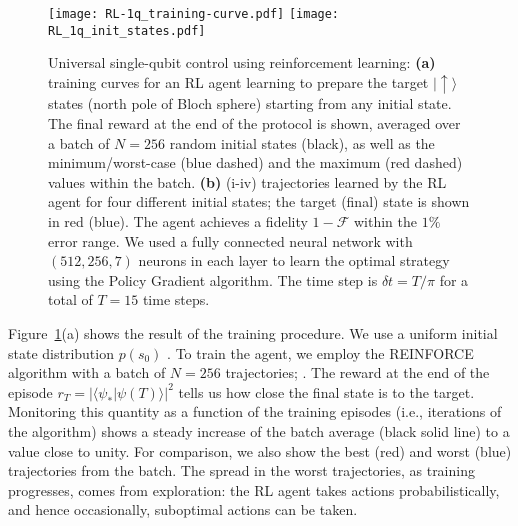 \begin{figure}[t!]
\texttt{[image: RL-1q\_training-curve.pdf]}
\texttt{[image: RL\_1q\_init\_states.pdf]}
\caption{
Universal single-qubit control using reinforcement learning:
\textbf{(a)} training curves for an RL agent learning to prepare the target $|\uparrow\rangle$ states (north pole of Bloch sphere) starting from any initial state. The final reward at the end of the protocol is shown, averaged over a batch of $N=256$ random initial states (black), as well as the minimum/worst-case (blue dashed) and the maximum (red dashed) values within the batch. 
\textbf{(b)} (i-iv) trajectories learned by the RL agent for four different initial states; the target (final) state is shown in red (blue). The agent achieves a fidelity $1-\mathcal{F}$ within the $1\%$ error range. 
We used a fully connected neural network with $(512, 256,7)$ neurons in each layer to learn the optimal strategy using the Policy Gradient algorithm.
The time step is $\delta t = T/\pi$ for a total of $T=15$ time steps.}
\label{fig:RL_qubit}
\end{figure}


Figure~\ref{fig:RL_qubit}(a) shows the result of the training procedure. We use a uniform initial state distribution $p(s_0)$ . To train the agent, we employ the REINFORCE algorithm with a batch of $N=256$ trajectories; . The reward at the end of the episode $r_T=|\langle\psi_\ast|\psi(T)\rangle|^2$ tells us how close the final state is to the target. Monitoring this quantity as a function of the training episodes (i.e., iterations of the algorithm) shows a steady increase of the batch average (black solid line) to a value close to unity. For comparison, we also show the best (red) and worst (blue) trajectories from the batch. The spread in the worst trajectories, as training progresses, comes from exploration: the RL agent takes actions probabilistically, and hence occasionally, suboptimal actions can be taken. 

